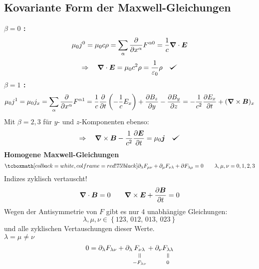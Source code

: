 \subsection{Kovariante Form der Maxwell-Gleichungen}

\noindent
\textbf{$ \beta = 0 $ :}
\begin{equation*}
\mu_0 j^0 = \mu_0 c \rho = \sum_{\alpha} \frac{\partial }{\partial x^\alpha} F^{\alpha 0} = \frac{1}{c} \bm{\nabla} \cdot \bm{E}
\end{equation*}
\begin{equation*}
\Rightarrow \quad \vabla \cdot \vec{E} = \mu_0 c^2 \rho = \frac{1}{\epsilon_0} \rho \quad \checkmark
\end{equation*}
\textbf{$ \beta = 1 $ :}
\begin{equation*}
\mu_0 j^1 = \mu_0 j_x = \sum_{\alpha} \frac{\partial }{\partial x^\alpha} F^{\alpha 1} = \frac{1}{c} \frac{\partial }{\partial t} \left(- \frac{1}{c} E_x\right) + \frac{\partial B_z}{\partial y} - \frac{\partial B_y}{\partial z} = - \frac{1}{c^2} \frac{\partial E_x}{\partial t} + (\bm{\nabla} \times \bm{B})_x
\end{equation*}
Mit $ \beta = 2, 3 $ für $ y $- und $ z $-Komponenten ebenso:
\begin{equation*}
\Rightarrow \quad \vabla \times \vec{B} - \frac{1}{c^2} \prt{\vec{E}}{t} = \mu_0 \vec{j} \quad \checkmark
\end{equation*}
\textbf{Homogene Maxwell-Gleichungen}
\begin{equation*}
\rmbox{ \partial_{\lambda} F_{\mu \nu} + \partial_{\mu} F_{\nu \lambda} + \partial F_{\lambda \mu} = 0} \qquad \lambda, \mu, \nu = 0, 1, 2, 3
\end{equation*}
\noindent
Indizes zyklisch vertauscht!
\begin{equation*}
\bm{\nabla} \cdot \bm{B} = 0 \qquad \bm{\nabla} \times \bm{E} + \frac{\partial \bm{B}}{\partial t} = 0
\end{equation*}
Wegen der Antisymmetrie von $ F $ gibt es nur 4 unabhängige Gleichungen:
\begin{equation*}
\lambda, \mu, \nu \in \left\{ 123,\, 012,\, 013,\, 023 \right\}
\end{equation*}
und alle zyklischen Vertauschungen dieser Werte.\\[5pt]
\textbf{$ \lambda = \mu \neq \nu $}
\begin{equation*}
0 = \partial_{\lambda} F_{\lambda \nu} + \partial_{\lambda} \equalto{F_{\nu \lambda}}{- F_{\lambda \nu}} + \partial _{\nu} \equalto{F_{\lambda \lambda}}{0}
\end{equation*}
